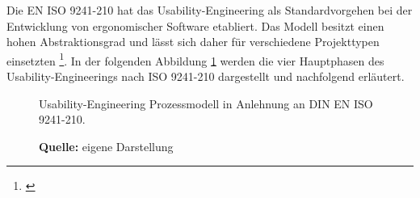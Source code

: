 Die EN ISO 9241-210 hat das Usability-Engineering als Standardvorgehen bei der Entwicklung von ergonomischer Software etabliert. Das Modell besitzt einen hohen Abstraktionsgrad und lässt sich daher für verschiedene Projekttypen einsetzten \footnote{\cite[vgl.][21]{Ecker2016}}. In der folgenden Abbildung \ref{fig:usabilityEngineeringVorgehensmodell} werden die vier Hauptphasen des Usability-Engineerings nach ISO 9241-210 dargestellt und nachfolgend erläutert.
\begin{figure}[H]
  \centering
  \caption{Usability-Engineering Prozessmodell in Anlehnung an DIN EN ISO 9241-210.}
  \caption*{\textbf{Quelle:} eigene Darstellung}
  \label{fig:usabilityEngineeringVorgehensmodell}
\end{figure}
